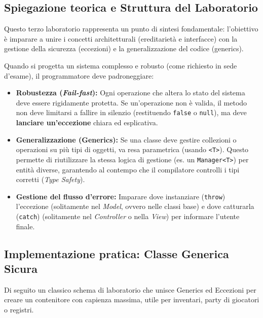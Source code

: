 \documentclass[12pt, a4paper]{article}
\begin{document}
\subsection{Spiegazione teorica e Struttura del Laboratorio}
Questo terzo laboratorio rappresenta un punto di sintesi fondamentale: l'obiettivo è imparare a unire i concetti architetturali (ereditarietà e interfacce) con la gestione della sicurezza (eccezioni) e la generalizzazione del codice (generics).

Quando si progetta un sistema complesso e robusto (come richiesto in sede d'esame), il programmatore deve padroneggiare:


\begin{itemize}
    \item \textbf{Robustezza (\textit{Fail-fast}):} Ogni operazione che altera lo stato del sistema deve essere rigidamente protetta. Se un'operazione non è valida, il metodo non deve limitarsi a fallire in silenzio (restituendo \texttt{false} o \texttt{null}), ma deve \textbf{lanciare un'eccezione} chiara ed esplicativa.
    \item \textbf{Generalizzazione (Generics):} Se una classe deve gestire collezioni o operazioni su più tipi di oggetti, va resa parametrica (usando \texttt{<T>}). Questo permette di riutilizzare la stessa logica di gestione (es. un \texttt{Manager<T>}) per entità diverse, garantendo al contempo che il compilatore controlli i tipi corretti (\textit{Type Safety}).
    \item \textbf{Gestione del flusso d'errore:} Imparare dove instanziare (\texttt{throw}) l'eccezione (solitamente nel \textit{Model}, ovvero nelle classi base) e dove catturarla (\texttt{catch}) (solitamente nel \textit{Controller} o nella \textit{View}) per informare l'utente finale.
\end{itemize}

\subsection{Implementazione pratica: Classe Generica Sicura}
Di seguito un classico schema di laboratorio che unisce Generics ed Eccezioni per creare un contenitore con capienza massima, utile per inventari, party di giocatori o registri.

\newpage
\end{document}
